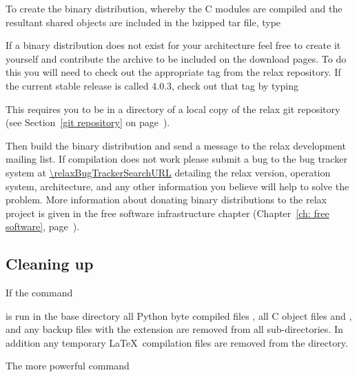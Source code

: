 
To create the binary distribution, whereby the C modules are compiled and the resultant shared objects are included in the bzipped tar file, type


If a binary distribution does not exist for your architecture feel free to create it yourself and contribute the archive to be included on the download pages.
To do this you will need to check out the appropriate tag from the relax repository.
If the current stable release is called 4.0.3, check out that tag by typing


This requires you to be in a directory of a local copy of the relax git repository (see Section~\ref{git repository} on page~\pageref{git repository}).

Then build the binary distribution and send a message to the relax development mailing list.
If compilation does not work please submit a bug to the bug tracker system at \url{\relaxBugTrackerSearchURL} detailing the relax version, operation system, architecture, and any other information you believe will help to solve the problem.
More information about donating binary distributions to the relax project is given in the free software infrastructure chapter (Chapter~\ref{ch: free software}, page~\pageref{ch: free software}).



\subsection{Cleaning up}

If the command


is run in the base directory all Python byte compiled files , all C object files  and , and any backup files with the extension  are removed from all sub-directories.
In addition any temporary \LaTeX\ compilation files are removed from the  directory.

The more powerful command


